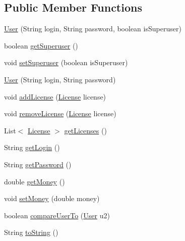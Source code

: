 \subsection*{Public Member Functions}
\begin{DoxyCompactItemize}
\item 
\hyperlink{classes_1_1deusto_1_1server_1_1db_1_1data_1_1_user_a99b61ff1f905036e1aeea2813a2fb1c1}{User} (String login, String password, boolean is\+Superuser)
\item 
boolean \hyperlink{classes_1_1deusto_1_1server_1_1db_1_1data_1_1_user_a3b6d6d064ccfe7e0dc2a7c6c132cdfc0}{get\+Superuser} ()
\item 
void \hyperlink{classes_1_1deusto_1_1server_1_1db_1_1data_1_1_user_a386c51067e68570828d9dcd130e6fe74}{set\+Superuser} (boolean is\+Superuser)
\item 
\hyperlink{classes_1_1deusto_1_1server_1_1db_1_1data_1_1_user_accf4cd75adc5bfc6cd376a1714517ba9}{User} (String login, String password)
\item 
void \hyperlink{classes_1_1deusto_1_1server_1_1db_1_1data_1_1_user_a1eefc1e49d4bf8046f3a7cdbca7f670d}{add\+License} (\hyperlink{classes_1_1deusto_1_1server_1_1db_1_1data_1_1_license}{License} license)
\item 
void \hyperlink{classes_1_1deusto_1_1server_1_1db_1_1data_1_1_user_a5ee17c4a3ab4eceb028a087f96527375}{remove\+License} (\hyperlink{classes_1_1deusto_1_1server_1_1db_1_1data_1_1_license}{License} license)
\item 
List$<$ \hyperlink{classes_1_1deusto_1_1server_1_1db_1_1data_1_1_license}{License} $>$ \hyperlink{classes_1_1deusto_1_1server_1_1db_1_1data_1_1_user_adeddbb54df77d3779f739f27959588e1}{get\+Licenses} ()
\item 
String \hyperlink{classes_1_1deusto_1_1server_1_1db_1_1data_1_1_user_a2bc07e76806b027ef70b5ad8cea5f9fa}{get\+Login} ()
\item 
String \hyperlink{classes_1_1deusto_1_1server_1_1db_1_1data_1_1_user_ac576607b3eae9e9b8c7002d5cd7c1a62}{get\+Password} ()
\item 
double \hyperlink{classes_1_1deusto_1_1server_1_1db_1_1data_1_1_user_a28bcff322718c86a4c69dcff039ecf16}{get\+Money} ()
\item 
void \hyperlink{classes_1_1deusto_1_1server_1_1db_1_1data_1_1_user_af7fe255820b6ddd9020c24994cdc6e23}{set\+Money} (double money)
\item 
boolean \hyperlink{classes_1_1deusto_1_1server_1_1db_1_1data_1_1_user_a9dee5f17849d7718c225034d384844ae}{compare\+User\+To} (\hyperlink{classes_1_1deusto_1_1server_1_1db_1_1data_1_1_user}{User} u2)
\item 
String \hyperlink{classes_1_1deusto_1_1server_1_1db_1_1data_1_1_user_a494980951c4c71c0a793994b7bcd5101}{to\+String} ()
\end{DoxyCompactItemize}


